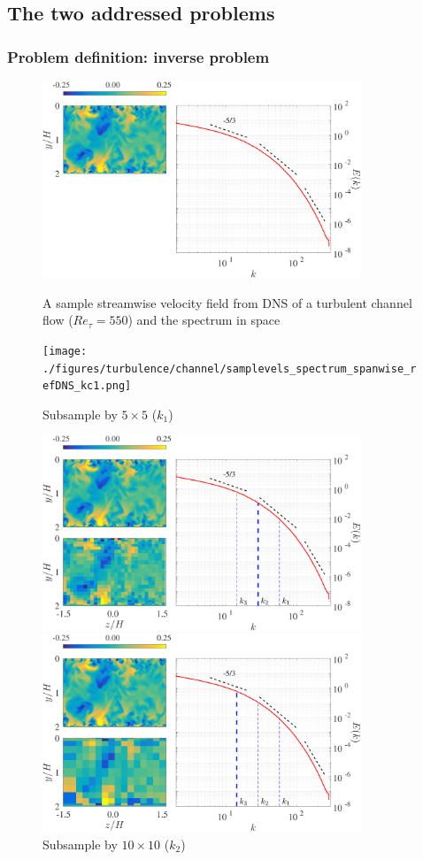 \documentclass{beamer}
\begin{document}
\subsection[The two problems]{The two addressed problems}
\begin{frame}
\frametitle{Problem definition: inverse problem}
	\begin{figure}
		\begin{overprint}
			\centerline{\includegraphics[width=0.85\textwidth]{./figures/turbulence/channel/samplevels_spectrum_spanwise_refDNS_ref.png}}
			\caption*{A sample streamwise velocity field from DNS of a turbulent channel flow ($ Re_\tau = 550 $) and the spectrum in space}
			\centerline{\texttt{[image: ./figures/turbulence/channel/samplevels\_spectrum\_spanwise\_refDNS\_kc1.png]}}
			\caption*{Subsample by $ 5 \times 5 $ ($ k_1 $)}
			\centerline{\includegraphics[width=0.85\textwidth]{./figures/turbulence/channel/samplevels_spectrum_spanwise_refDNS_kc2.png}}
			\caption*{Subsample by $ 10 \times 10 $ ($ k_2 $)}
			\centerline{\includegraphics[width=0.85\textwidth]{./figures/turbulence/channel/samplevels_spectrum_spanwise_refDNS_kc3.png}}

\end{overprint}
\end{figure}
\end{frame}
\end{document}
